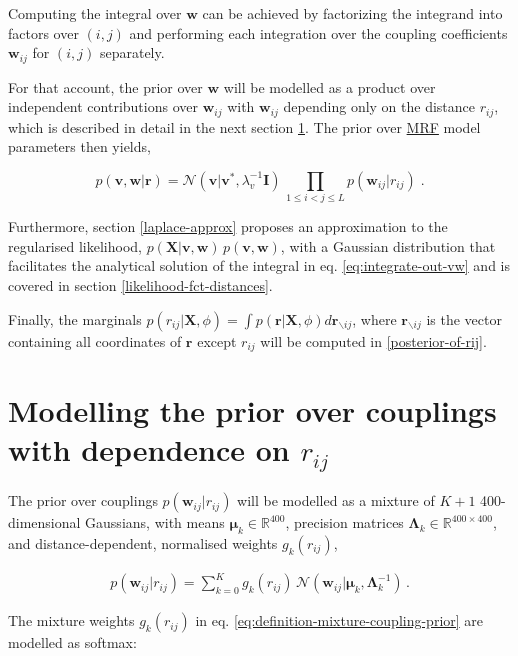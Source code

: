 \documentclass[12pt,a4paper,twoside]{book}
\newcommand{\Gauss}{\mathcal{N}}
\newcommand{\I}{\mathbf{I}}
\newcommand{\Lk}{\mathbf{\Lambda}_k}
\newcommand{\muk}{\mathbf{\mu}_k}
\renewcommand{\r}{\mathbf{r}}
\newcommand{\rij}{r_{ij}}
\renewcommand{\v}{\mathbf{v}}
\newcommand{\w}{\mathbf{w}}
\newcommand{\wij}{\mathbf{w}_{ij}}
\newcommand{\X}{\mathbf{X}}
\theoremstyle{definition}
\theoremstyle{definition}
\theoremstyle{remark}
\begin{document}
Computing the integral over \(\w\) can be achieved by factorizing the
integrand into factors over \((i,j)\) and performing each integration
over the coupling coefficients \(\wij\) for \((i,j)\) separately.

For that account, the prior over \(\w\) will be modelled as a product
over independent contributions over \(\wij\) with \(\wij\) depending
only on the distance \(\rij\), which is described in detail in the next
section \ref{coupling-prior}. The prior over
\protect\hyperlink{abbrev}{MRF} model parameters then yields,

\begin{equation}
  p(\v,\w|\r) = \Gauss(\v|\v^*,\lambda_v^{-1} \I) \, \prod_{1\le i<j\le L} p(\wij|\rij) \; .
\label{eq:definition-parameter-prior}
\end{equation}

Furthermore, section \ref{laplace-approx} proposes an approximation to
the regularised likelihood, \(p(\X | \v,\w) \, p(\v, \w)\), with a
Gaussian distribution that facilitates the analytical solution of the
integral in eq. \eqref{eq:integrate-out-vw} and is covered in section
\ref{likelihood-fct-distances}.

Finally, the marginals
\(p(\rij | \X, \phi) = \int p(\r | \X, \phi) d \r_{\backslash ij}\),
where \(\r_{\backslash ij}\) is the vector containing all coordinates of
\(\r\) except \(\rij\) will be computed in \ref{posterior-of-rij}.

\section{\texorpdfstring{Modelling the prior over couplings with
dependence on
\(\rij\)}{Modelling the prior over couplings with dependence on \textbackslash{}rij}}\label{coupling-prior}

The prior over couplings \(p(\wij|\rij)\) will be modelled as a mixture
of \(K\!+\!1\) 400-dimensional Gaussians, with means
\(\muk \in \mathbb{R}^{400}\), precision matrices
\(\Lk \in \mathbb{R}^{400\times 400}\), and distance-dependent,
normalised weights \(g_k(\rij)\),

\begin{align}   
      p(\wij | \rij) = \sum_{k=0}^K g_k(\rij) \, \Gauss(\wij | \muk, \Lk^{-1}) \,.
\label{eq:definition-mixture-coupling-prior}
\end{align}

The mixture weights \(g_k(\rij)\) in eq.
\eqref{eq:definition-mixture-coupling-prior} are modelled as softmax:
\end{document}
